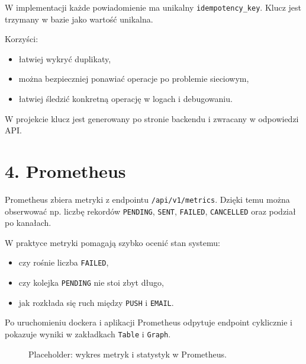 \documentclass[a4paper,12pt]{article}
\begin{document}
W implementacji każde powiadomienie ma unikalny \texttt{idempotency\_key}. Klucz jest trzymany w bazie jako wartość unikalna.

Korzyści:
\begin{itemize}[leftmargin=1.5em]
    \item łatwiej wykryć duplikaty,
    \item można bezpieczniej ponawiać operacje po problemie sieciowym,
    \item łatwiej śledzić konkretną operację w logach i debugowaniu.
\end{itemize}

W projekcie klucz jest generowany po stronie backendu i zwracany w odpowiedzi API.

\section*{4. Prometheus}

Prometheus zbiera metryki z endpointu \texttt{/api/v1/metrics}. Dzięki temu można obserwować np. liczbę rekordów \texttt{PENDING}, \texttt{SENT}, \texttt{FAILED}, \texttt{CANCELLED} oraz podział po kanałach.

W praktyce metryki pomagają szybko ocenić stan systemu:
\begin{itemize}[leftmargin=1.5em]
    \item czy rośnie liczba \texttt{FAILED},
    \item czy kolejka \texttt{PENDING} nie stoi zbyt długo,
    \item jak rozkłada się ruch między \texttt{PUSH} i \texttt{EMAIL}.
\end{itemize}

Po uruchomieniu dockera i aplikacji Prometheus odpytuje endpoint cyklicznie i pokazuje wyniki w zakładkach \texttt{Table} i \texttt{Graph}.

\begin{figure}[H]
    \centering
    \caption{Placeholder: wykres metryk i statystyk w Prometheus.}
\end{figure}
\end{document}
